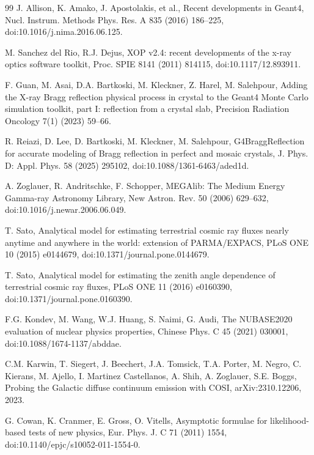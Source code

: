 \documentclass[11pt]{article}
\begin{document}
\begin{thebibliography}{99}
J. Allison, K. Amako, J. Apostolakis, et al., Recent developments in Geant4, Nucl. Instrum. Methods Phys. Res. A 835 (2016) 186--225, doi:10.1016/j.nima.2016.06.125.

M. Sanchez del Rio, R.J. Dejus, XOP v2.4: recent developments of the x-ray optics software toolkit, Proc. SPIE 8141 (2011) 814115, doi:10.1117/12.893911.

F. Guan, M. Asai, D.A. Bartkoski, M. Kleckner, Z. Harel, M. Salehpour, Adding the X-ray Bragg reflection physical process in crystal to the Geant4 Monte Carlo simulation toolkit, part I: reflection from a crystal slab, Precision Radiation Oncology 7(1) (2023) 59--66.

R. Reiazi, D. Lee, D. Bartkoski, M. Kleckner, M. Salehpour, G4BraggReflection for accurate modeling of Bragg reflection in perfect and mosaic crystals, J. Phys. D: Appl. Phys. 58 (2025) 295102, doi:10.1088/1361-6463/aded1d.

A. Zoglauer, R. Andritschke, F. Schopper, MEGAlib: The Medium Energy Gamma-ray Astronomy Library, New Astron. Rev. 50 (2006) 629--632, doi:10.1016/j.newar.2006.06.049.

T. Sato, Analytical model for estimating terrestrial cosmic ray fluxes nearly anytime and anywhere in the world: extension of PARMA/EXPACS, PLoS ONE 10 (2015) e0144679, doi:10.1371/journal.pone.0144679.

T. Sato, Analytical model for estimating the zenith angle dependence of terrestrial cosmic ray fluxes, PLoS ONE 11 (2016) e0160390, doi:10.1371/journal.pone.0160390.

F.G. Kondev, M. Wang, W.J. Huang, S. Naimi, G. Audi, The NUBASE2020 evaluation of nuclear physics properties, Chinese Phys. C 45 (2021) 030001, doi:10.1088/1674-1137/abddae.

C.M. Karwin, T. Siegert, J. Beechert, J.A. Tomsick, T.A. Porter, M. Negro, C. Kierans, M. Ajello, I. Martinez Castellanos, A. Shih, A. Zoglauer, S.E. Boggs, Probing the Galactic diffuse continuum emission with COSI, arXiv:2310.12206, 2023.

G. Cowan, K. Cranmer, E. Gross, O. Vitells, Asymptotic formulae for likelihood-based tests of new physics, Eur. Phys. J. C 71 (2011) 1554, doi:10.1140/epjc/s10052-011-1554-0.

\end{thebibliography}
\end{document}
